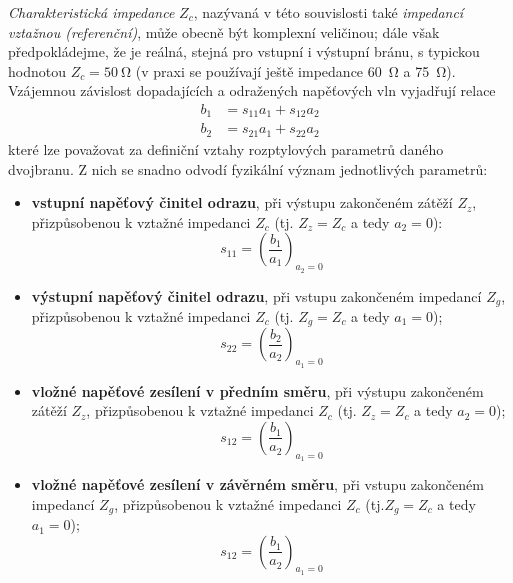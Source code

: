       \emph{Charakteristická impedance} \(Z_c\), nazývaná v této souvislosti také \emph{impedancí 
      vztažnou (referenční)}, může obecně být komplexní veličinou; dále však předpokládejme, že je 
      reálná, stejná pro vstupní i výstupní bránu, s typickou hodnotou \(Z_c = \qty{50}{\ohm}\) (v 
      praxi se používají ještě impedance \qty{60}{\ohm} a \qty{75}{\ohm}). Vzájemnou závislost 
      dopadajících a odražených napěťových vln vyjadřují relace
      \begin{align}\label{RA:eq_03}
      b_1 &= s_{11}a_1 + s_{12}a_2   \\ 
      b_2 &= s_{21}a_1 + s_{22}a_2
      \end{align}
      které lze považovat za definiční vztahy rozptylových parametrů daného dvojbranu. Z nich se 
      snadno odvodí fyzikální význam jednotlivých parametrů:
      \begin{itemize}
        \item \textbf{vstupní napěťový činitel odrazu}, při výstupu zakončeném zátěží \(Z_z\), 
              přizpůsobenou k vztažné impedanci \(Z_c\)  (tj. \(Z_z = Z_c\) a tedy \(a_2 = 0\)):
              \begin{equation*}
                s_{11} = \left(\dfrac{b_1}{a_1}\right)_{a_2=0}
              \end{equation*}
        \item \textbf{výstupní napěťový činitel odrazu}, při vstupu zakončeném impedancí \(Z_g\), 
               přizpůsobenou k vztažné impedanci \(Z_c\) (tj. \(Z_g = Z_c\) a tedy \(a_1 = 0\)); 
              \begin{equation*}
                 s_{22} = \left(\dfrac{b_2}{a_2}\right)_{a_1=0}
              \end{equation*}
        \item \textbf{vložné napěťové zesílení v předním směru}, při výstupu zakončeném zátěží 
              \(Z_z\), přizpůsobenou k vztažné impedanci \(Z_c\) (tj. \(Z_z = Z_c\) a tedy \(a_2 = 
              0\));
              \begin{equation*}
                 s_{12} = \left(\dfrac{b_1}{a_2}\right)_{a_1=0}
              \end{equation*}
        \item \textbf{vložné napěťové zesílení v závěrném směru}, při vstupu zakončeném impedancí 
              \(Z_g\), přizpůsobenou k vztažné impedanci \(Z_c\) (tj.\(Z_g = Z_c\) a tedy \(a_1 = 
              0\)); \\
              \begin{equation*}
                 s_{12} = \left(\dfrac{b_1}{a_2}\right)_{a_1=0}
              \end{equation*}
      \end{itemize}
      
